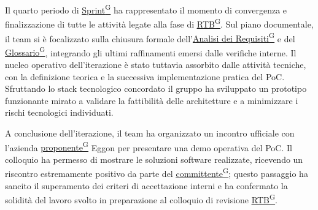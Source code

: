 \documentclass[a4paper,12pt]{article}
\providecommand{\glslink}[2]{\href{https://alittlebyte-19.github.io/Documentazione/glossario.html\#gls-#1}{\underline{#2}\textsuperscript{\scriptsize G}}}
\begin{document}
Il quarto periodo di \glslink{sprint}{Sprint} ha rappresentato il momento di convergenza e finalizzazione di tutte le attività legate alla fase di \glslink{rtb-requirements-and-technology-baseline}{RTB}. Sul piano documentale, il team si è focalizzato sulla chiusura formale dell'\glslink{analisi-dei-requisiti-adr}{Analisi dei Requisiti} e del \glslink{glossario}{Glossario}, integrando gli ultimi raffinamenti emersi dalle verifiche interne. Il nucleo operativo dell'iterazione è stato tuttavia assorbito dalle attività tecniche, con la definizione teorica e la successiva implementazione pratica del PoC. Sfruttando lo stack tecnologico concordato il gruppo ha sviluppato un prototipo funzionante mirato a validare la fattibilità delle architetture e a minimizzare i rischi tecnologici individuati. 

A conclusione dell'iterazione, il team ha organizzato un incontro ufficiale con l'azienda \glslink{committente-proponente}{proponente} Eggon per presentare una demo operativa del PoC. Il colloquio ha permesso di mostrare le soluzioni software realizzate, ricevendo un riscontro estremamente positivo da parte del \glslink{committente-proponente}{committente}; questo passaggio ha sancito il superamento dei criteri di accettazione interni e ha confermato la solidità del lavoro svolto in preparazione al colloquio di revisione \glslink{rtb-requirements-and-technology-baseline}{RTB}.
\end{document}
